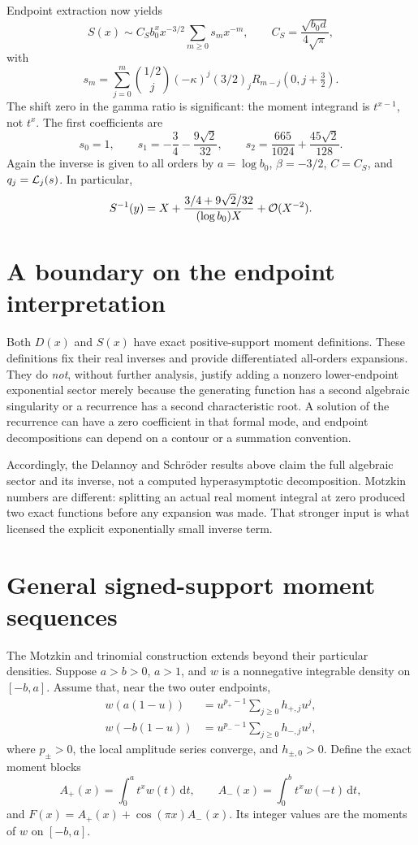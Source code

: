 \documentclass[11pt,openany]{book}
\numberwithin{equation}{chapter}
\theoremstyle{plain}
\theoremstyle{definition}
\theoremstyle{remark}
\newcommand{\ddn}{\mathrm d}                  %
\newcommand{\rising}[2]{(#1)_{#2}}
\begin{document}
Endpoint extraction now yields
\begin{equation}
 S(x)\sim C_S b_0^xx^{-3/2}\sum_{m\ge0}s_mx^{-m},
 \qquad C_S=\frac{\sqrt{b_0d}}{4\sqrt\pi},
 \label{t2:eq:schroder-asymp}
\end{equation}
with
\begin{equation}
 s_m=\sum_{j=0}^m\binom{1/2}{j}(-\kappa)^j
                  \rising{3/2}{j}R_{m-j}(0,j+\tfrac32).
 \label{t2:eq:schroder-coeff}
\end{equation}
The shift zero in the gamma ratio is significant: the moment integrand is $t^{x-1}$, not $t^x$. The first coefficients are
\[
 s_0=1,\qquad s_1=-\frac34-\frac{9\sqrt2}{32},\qquad
 s_2=\frac{665}{1024}+\frac{45\sqrt2}{128}.
\]
Again the inverse is given to all orders by $a=\log b_0$, $\beta=-3/2$, $C=C_S$, and $q_j=\mathcal L_j(s)$. In particular,
\[
 S^{-1}(y)=X+\frac{3/4+9\sqrt2/32}{(\log b_0)X}+\mathcal O(X^{-2}).
\]

\section{A boundary on the endpoint interpretation}

Both $D(x)$ and $S(x)$ have exact positive-support moment definitions. These definitions fix their real inverses and provide differentiated all-orders expansions. They do \emph{not}, without further analysis, justify adding a nonzero lower-endpoint exponential sector merely because the generating function has a second algebraic singularity or a recurrence has a second characteristic root. A solution of the recurrence can have a zero coefficient in that formal mode, and endpoint decompositions can depend on a contour or a summation convention.

Accordingly, the Delannoy and Schr\"oder results above claim the full algebraic sector and its inverse, not a computed hyperasymptotic decomposition. Motzkin numbers are different: splitting an actual real moment integral at zero produced two exact functions before any expansion was made. That stronger input is what licensed the explicit exponentially small inverse term.
\section{General signed-support moment sequences}
The Motzkin and trinomial construction extends beyond their particular densities. Suppose $a>b>0$, $a>1$, and $w$ is a nonnegative integrable density on $[-b,a]$. Assume that, near the two outer endpoints,
\begin{align}
 w(a(1-u))&=u^{p_+-1}\sum_{j\ge0}h_{+,j}u^j,\nonumber\\
 w(-b(1-u))&=u^{p_--1}\sum_{j\ge0}h_{-,j}u^j,
 \label{t1:eq:generalendpoints}
\end{align}
where $p_\pm>0$, the local amplitude series converge, and $h_{\pm,0}>0$. Define the exact moment blocks
\[
 A_+(x)=\int_0^a t^xw(t)\,\ddn t,\qquad
 A_-(x)=\int_0^b t^xw(-t)\,\ddn t,
\]
and $F(x)=A_+(x)+\cos(\pi x)A_-(x)$. Its integer values are the moments of $w$ on $[-b,a]$.
\end{document}
